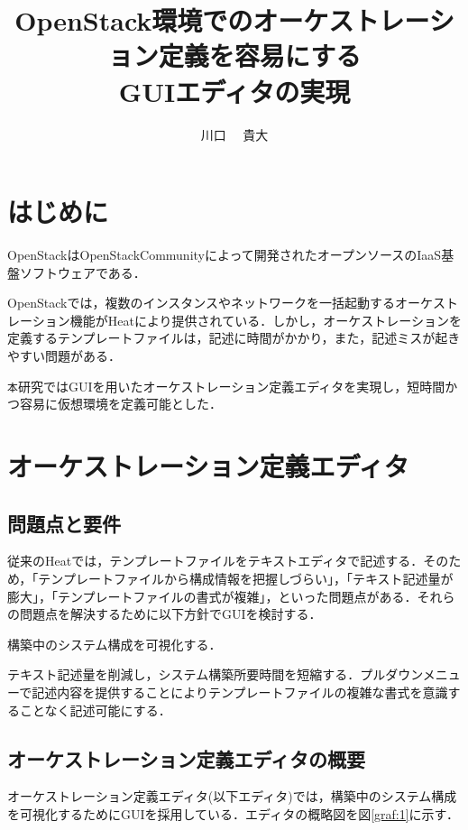 \documentclass[a4j]{jarticle}
\title{OpenStack環境でのオーケストレーション定義を容易にする\\GUIエディタの実現}
\author{川口 ~~貴大}
\begin{document}
\begin{Abstract}
 
 \section{はじめに}
 OpenStackはOpenStackCommunityによって開発されたオープンソースのIaaS基盤ソフトウェアである．\cite{Document:1}
 
 OpenStackでは，複数のインスタンスやネットワークを一括起動するオーケストレーション機能がHeatにより提供されている．しかし，オーケストレーションを定義するテンプレートファイルは，記述に時間がかかり，また，記述ミスが起きやすい問題がある．
 
 \texttt 本研究ではGUIを用いたオーケストレーション定義エディタを実現し，短時間かつ容易に仮想環境を定義可能とした．
 \section{オーケストレーション定義エディタ}
 \subsection{問題点と要件}
 従来のHeatでは，テンプレートファイルをテキストエディタで記述する．そのため，「テンプレートファイルから構成情報を把握しづらい」，「テキスト記述量が膨大」，「テンプレートファイルの書式が複雑」，といった問題点がある．それらの問題点を解決するために以下方針でGUIを検討する．
 \begin{description}
 	\vspace{-2mm}
 	\item[(GUIを採用)]構築中のシステム構成を可視化する．
 	\vspace{-2mm}
 	\item[(テキスト入力を撤廃)]テキスト記述量を削減し，システム構築所要時間を短縮する．プルダウンメニューで記述内容を提供することによりテンプレートファイルの複雑な書式を意識することなく記述可能にする．
 	\vspace{-2mm}
 \end{description}
 \vspace{-1mm}
 \subsection{オーケストレーション定義エディタの概要}
 オーケストレーション定義エディタ(以下エディタ)では，構築中のシステム構成を可視化するためにGUIを採用している．エディタの概略図を図\ref{graf:1}に示す．
 

\end{Abstract}
\end{document}
